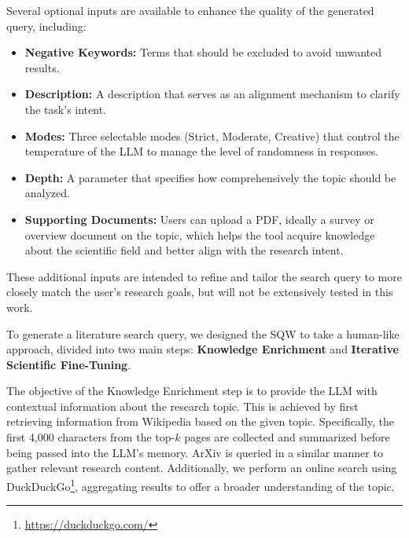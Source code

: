 Several optional inputs are available to enhance the quality of the generated query, including:
\begin{itemize}
	
\item \textbf{Negative Keywords:} Terms that should be excluded to avoid unwanted results.
\item \textbf{Description:} A description that serves as an alignment mechanism to clarify the task’s intent.
\item \textbf{Modes:} Three selectable modes (Strict, Moderate, Creative) that control the temperature of the LLM to manage the level of randomness in responses.
\item \textbf{Depth:} A parameter that specifies how comprehensively the topic should be analyzed.
\item \textbf{Supporting Documents:} Users can upload a PDF, ideally a survey or overview document on the topic, which helps the tool acquire knowledge about the scientific field and better align with the research intent.

\end{itemize}
These additional inputs are intended to refine and tailor the search query to more closely match the user's research goals, but will not be extensively tested in this work.

To generate a literature search query, we designed the SQW to take a human-like approach, divided into two main steps: \textbf{Knowledge Enrichment} and \textbf{Iterative Scientific Fine-Tuning}.

The objective of the Knowledge Enrichment step is to provide the LLM with contextual information about the research topic. This is achieved by first retrieving information from Wikipedia based on the given topic. Specifically, the first 4,000 characters from the top-\( k \) pages are collected and summarized before being passed into the LLM's memory. ArXiv is queried in a similar manner to gather relevant research content. Additionally, we perform an online search using DuckDuckGo\footnote{\url{https://duckduckgo.com/}}, aggregating results to offer a broader understanding of the topic.


